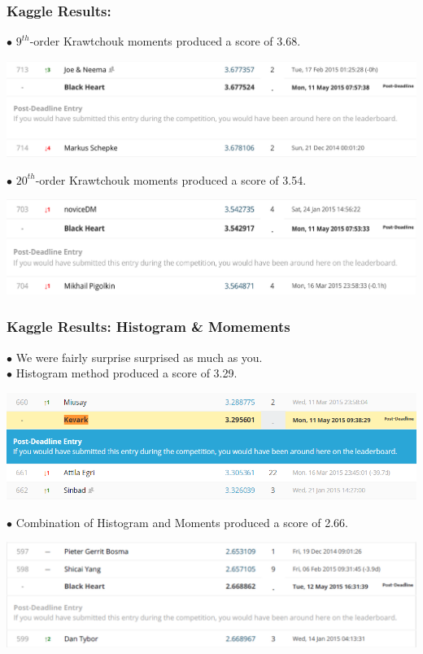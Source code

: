 \documentclass{beamer}
\begin{document}
\begin{frame}
	\frametitle{Kaggle Results:}
$\bullet$ $9^{th}$-order Krawtchouk moments produced a score of 3.68. \\
\begin{center}
	\includegraphics[scale=0.3]{9moments.png}
\end{center}
$\bullet$ $20^{th}$-order Krawtchouk moments produced a score of 3.54. \\
\begin{center}
	\includegraphics[scale=0.3]{20moments.png}
\end{center}

\end{frame}




\begin{frame}
	\frametitle{Kaggle Results: Histogram \& Momements}
$\bullet$ We were fairly surprise surprised as much as you.\\
$\bullet$ Histogram method produced a score of 3.29. \\
\begin{center}
	\includegraphics[scale=0.3]{submission.png}
\end{center}
$\bullet$ Combination of Histogram and Moments produced a score of 2.66. \\
\begin{center}
	\includegraphics[scale=0.25]{combined.png}
\end{center}
\end{frame}
\end{document}
